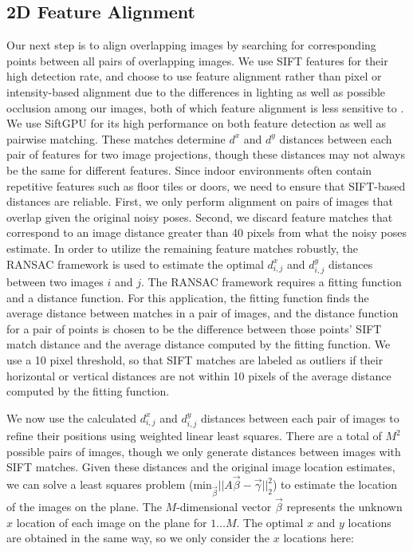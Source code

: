 \documentclass[]{spie}  %
\begin{document}
\subsection{2D Feature Alignment}
\label{sec:robustSIFTFeatureMatching}
Our next step is to align overlapping images by searching for
corresponding points between all pairs of overlapping images. We use
SIFT features for their high detection rate, and choose to use feature
alignment rather than pixel or intensity-based alignment due to the
differences in lighting as well as possible occlusion among our
images, both of which feature alignment is less sensitive to
\cite{lowe1999object, mikolajczyk2005performance, szeliski2006image}.
We use SiftGPU \cite{siftgpu} for its high performance on both feature
detection as well as pairwise matching. These matches determine $d^x$
and $d^y$ distances between each pair of features for two image
projections, though these distances may not always be the same for
different features. Since indoor environments often contain repetitive
features such as floor tiles or doors, we need to ensure that
SIFT-based distances are reliable. First, we only perform alignment on
pairs of images that overlap given the original noisy poses. Second,
we discard feature matches that correspond to an image distance
greater than 40 pixels from what the noisy poses estimate. In order to
utilize the remaining feature matches robustly, the RANSAC framework
\cite{fischler1981random} is used to estimate the optimal $d^x_{i,j}$
and $d^y_{i,j}$ distances between two images $i$ and $j$. The RANSAC
framework requires a fitting function and a distance function. For
this application, the fitting function finds the average distance
between matches in a pair of images, and the distance function for a
pair of points is chosen to be the difference between those points'
SIFT match distance and the average distance computed by the fitting
function. We use a 10 pixel threshold, so that SIFT matches are
labeled as outliers if their horizontal or vertical distances are not
within 10 pixels of the average distance computed by the fitting
function.

We now use the calculated $d^x_{i,j}$ and $d^y_{i,j}$ distances
between each pair of images to refine their positions using weighted
linear least squares. There are a total of $M^{2}$ possible pairs of
images, though we only generate distances between images with SIFT
matches. Given these distances and the original image location
estimates, we can solve a least squares problem
($\textrm{min}_{\vec{\beta}} ||A \vec{\beta} - \vec{\gamma}||_2^2 $)
to estimate the location of the images on the plane. The
$M$-dimensional vector $\vec{\beta}$ represents the unknown $x$
location of each image on the plane for $1 \dots M$. The optimal $x$
and $y$ locations are obtained in the same way, so we only consider
the $x$ locations here:
\end{document}
